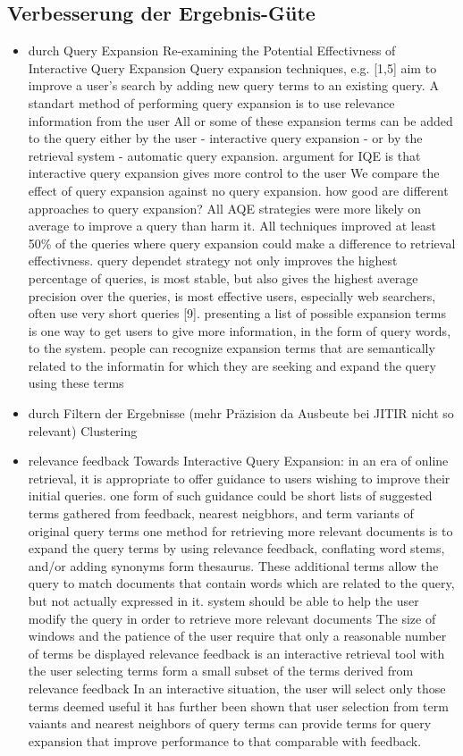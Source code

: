  \subsection{Verbesserung der Ergebnis-Güte}
	\begin{itemize}
		\item durch Query Expansion
		Re-examining the Potential Effectivness of Interactive Query Expansion
Query expansion techniques, e.g. [1,5] aim to improve a user's search by adding new query terms to an existing query. A standart method of performing query expansion is to use relevance information from the user
All or some of these expansion terms can be added to the query either by the user - interactive query expansion - or by the retrieval system - automatic query expansion.
argument for IQE is that interactive query expansion gives more control to the user
We compare the effect of query expansion against no query expansion. how good are different approaches to query expansion? 
All AQE strategies were more likely on average to improve a query than harm it. All techniques improved at least 50\% of the queries where query expansion could make a difference to retrieval effectivness.
query dependet strategy not only improves the highest percentage of queries, is most stable, but also gives the highest average precision over the queries, is most effective
users, especially web searchers, often use very short queries [9]. presenting a list of possible expansion terms is one way to get users to give more information, in the form of query words, to the system.
people can recognize expansion terms that are semantically related to the informatin for which they are seeking and expand the query using these terms

 		\item durch Filtern der Ergebnisse (mehr Präzision da Ausbeute bei JITIR nicht so relevant) Clustering
 		\item relevance feedback
 				Towards Interactive Query Expansion:
in an era of online retrieval, it is appropriate to offer guidance to users wishing to improve their initial queries. one form of such guidance could be short lists of suggested terms gathered from feedback, nearest neigbhors, and term variants of original query terms
one method for retrieving more relevant documents is to expand the query terms by using relevance feedback, conflating word stems, and/or adding synonyms form thesaurus. These additional terms allow the query to match documents that contain words which are related to the query, but not actually expressed in it. 
system should be able to help the user modify the query in order to retrieve more relevant documents
The size of windows and the patience of the user require that only a reasonable number of terms be displayed
relevance feedback is an interactive retrieval tool
with the user selecting terms form a small subset of the terms derived from relevance feedback
In an interactive situation, the user will select only those terms deemed useful
it has further been shown that user selection from term vaiants and nearest neighbors of query terms can provide terms for query expansion that improve performance to that comparable with feedback.
	\end{itemize}
